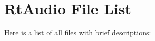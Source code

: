 \section{Rt\-Audio File List}
Here is a list of all files with brief descriptions:\begin{CompactList}
\item{}
\end{CompactList}
